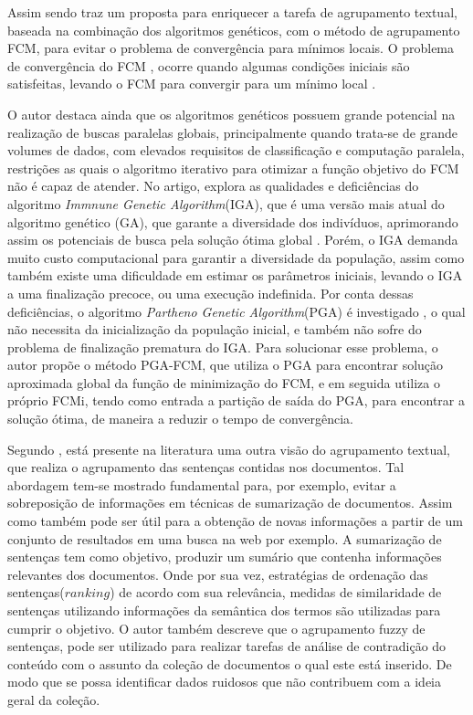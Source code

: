 Assim sendo  
traz um proposta para enriquecer a tarefa de agrupamento textual, baseada na
combinação dos algoritmos genéticos, com o método de agrupamento FCM, para 
evitar o problema de convergência para mínimos locais. O problema de convergência do FCM 
, ocorre quando algumas condições iniciais são satisfeitas, levando o FCM para 
convergir para um mínimo local \cite{Bezdek1984}.

O autor destaca ainda que os algoritmos genéticos possuem grande potencial na realização de
buscas paralelas globais, principalmente quando trata-se de grande volumes de dados, com elevados
requisitos de classificação e computação paralela, restrições as quais o algoritmo iterativo para
otimizar a função objetivo do FCM não é capaz de atender.
No artigo, explora as qualidades e deficiências do algoritmo 
\textit{Immnune Genetic Algorithm}(IGA), que é uma versão mais atual do algoritmo genético (GA),
que garante a diversidade dos indivíduos, aprimorando assim os potenciais de busca pela solução
ótima global \cite{Jiang2013}. Porém, o IGA demanda muito custo computacional para garantir a diversidade da
população, assim como também existe uma dificuldade em estimar os parâmetros iniciais, levando o IGA
a uma finalização precoce, ou uma execução indefinida. Por conta dessas deficiências, 
o algoritmo \textit{Partheno Genetic Algorithm}(PGA) é investigado
, o qual não necessita da inicialização da
população inicial, e também não sofre do problema de finalização prematura do IGA. Para solucionar esse problema, o autor
propõe o método PGA-FCM, que utiliza o PGA para encontrar solução aproximada global da função de
minimização do FCM, e em seguida utiliza o próprio FCMi, tendo como entrada a partição de saída do
PGA, para encontrar a solução ótima, de maneira a reduzir o tempo de convergência.

Segundo , está presente na literatura uma outra visão do agrupamento textual, que
realiza o agrupamento das sentenças contidas nos documentos. Tal abordagem tem-se mostrado 
fundamental para, por exemplo, evitar a sobreposição de informações em técnicas de sumarização de 
documentos. Assim como também
pode ser útil para a obtenção de novas informações a partir de um conjunto de resultados em uma
busca na web por exemplo. A sumarização de sentenças tem como objetivo, produzir um sumário que
contenha informações relevantes dos documentos. Onde por sua vez, estratégias de ordenação das
sentenças($ranking$) de acordo com sua relevância, medidas de similaridade de sentenças utilizando
informações da semântica dos termos são utilizadas para cumprir o objetivo. O autor também 
descreve que o agrupamento fuzzy de sentenças, pode ser utilizado para realizar
tarefas de análise de contradição do conteúdo com o assunto da coleção de documentos o qual este
está inserido. De modo que se possa identificar dados ruidosos que não contribuem com a ideia geral
da coleção.

